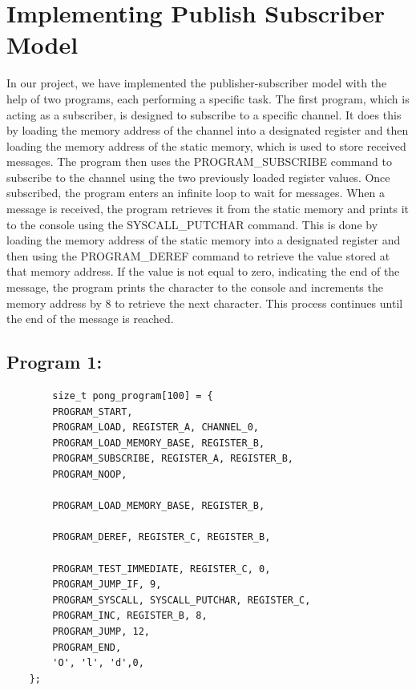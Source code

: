\documentclass[12pt]{report}
\begin{document}
    \chapter{Implementing Publish Subscriber Model}
    In our project, we have implemented the publisher-subscriber model with the help of two programs,
    each performing a specific task. The first program, which is acting as a subscriber,
    is designed to subscribe to a specific channel. It does this by loading the memory address of the channel 
    into a designated register and then loading the memory address of the static memory, which is used to store received messages.  
    The program then uses the PROGRAM\_SUBSCRIBE command to subscribe to the channel using the two previously loaded register values. 
    Once subscribed, the program enters an infinite loop to wait for messages. 
    When a message is received, the program retrieves it from the static memory and prints it to the console using the SYSCALL\_PUTCHAR
    command. This is done by loading the memory address of the static memory into a designated register and then using the PROGRAM\_DEREF
    command to retrieve the value stored at that memory address. If the value is not equal to zero, indicating the end of the message,
    the program prints the character to the console and increments the memory address by 8 to retrieve the next character. 
    This process continues until the end of the message is reached. 

	\pagebreak
    \section{Program 1:}
    \begin{verbatim}
        size_t pong_program[100] = { 
        PROGRAM_START, 
        PROGRAM_LOAD, REGISTER_A, CHANNEL_0,
        PROGRAM_LOAD_MEMORY_BASE, REGISTER_B, 
        PROGRAM_SUBSCRIBE, REGISTER_A, REGISTER_B, 
        PROGRAM_NOOP,

        PROGRAM_LOAD_MEMORY_BASE, REGISTER_B, 

        PROGRAM_DEREF, REGISTER_C, REGISTER_B, 

        PROGRAM_TEST_IMMEDIATE, REGISTER_C, 0, 
        PROGRAM_JUMP_IF, 9,                     
        PROGRAM_SYSCALL, SYSCALL_PUTCHAR, REGISTER_C, 
        PROGRAM_INC, REGISTER_B, 8, 
        PROGRAM_JUMP, 12, 
        PROGRAM_END, 
        'O', 'l', 'd',0, 
    }; 
    \end{verbatim}
\end{document}
